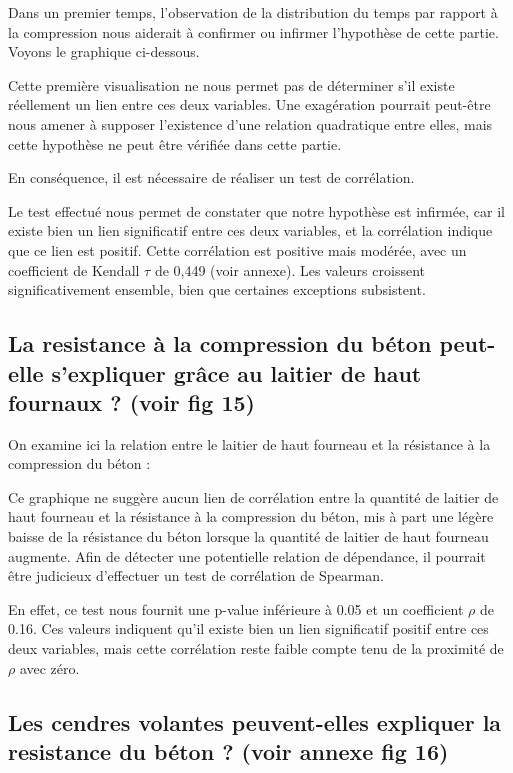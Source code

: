 \documentclass[
  12pt,
]{article}
\begin{document}
Dans un premier temps, l'observation de la distribution du temps par
rapport à la compression nous aiderait à confirmer ou infirmer
l'hypothèse de cette partie. Voyons le graphique ci-dessous.

Cette première visualisation ne nous permet pas de déterminer s'il
existe réellement un lien entre ces deux variables. Une exagération
pourrait peut-être nous amener à supposer l'existence d'une relation
quadratique entre elles, mais cette hypothèse ne peut être vérifiée dans
cette partie.

En conséquence, il est nécessaire de réaliser un test de corrélation.

Le test effectué nous permet de constater que notre hypothèse est
infirmée, car il existe bien un lien significatif entre ces deux
variables, et la corrélation indique que ce lien est positif. Cette
corrélation est positive mais modérée, avec un coefficient de Kendall
\(\tau\) de 0,449 (voir annexe). Les valeurs croissent significativement
ensemble, bien que certaines exceptions subsistent.

\subsection{La resistance à la compression du béton peut-elle
s'expliquer grâce au laitier de haut fournaux ? (voir fig
15)}\label{la-resistance-uxe0-la-compression-du-buxe9ton-peut-elle-sexpliquer-gruxe2ce-au-laitier-de-haut-fournaux-voir-fig-15}

On examine ici la relation entre le laitier de haut fourneau et la
résistance à la compression du béton :

Ce graphique ne suggère aucun lien de corrélation entre la quantité de
laitier de haut fourneau et la résistance à la compression du béton, mis
à part une légère baisse de la résistance du béton lorsque la quantité
de laitier de haut fourneau augmente. Afin de détecter une potentielle
relation de dépendance, il pourrait être judicieux d'effectuer un test
de corrélation de Spearman.

En effet, ce test nous fournit une p-value inférieure à 0.05 et un
coefficient \(\rho\) de 0.16. Ces valeurs indiquent qu'il existe bien un
lien significatif positif entre ces deux variables, mais cette
corrélation reste faible compte tenu de la proximité de \(\rho\) avec
zéro.

\subsection{Les cendres volantes peuvent-elles expliquer la resistance
du béton ? (voir annexe fig
16)}\label{les-cendres-volantes-peuvent-elles-expliquer-la-resistance-du-buxe9ton-voir-annexe-fig-16}
\end{document}
